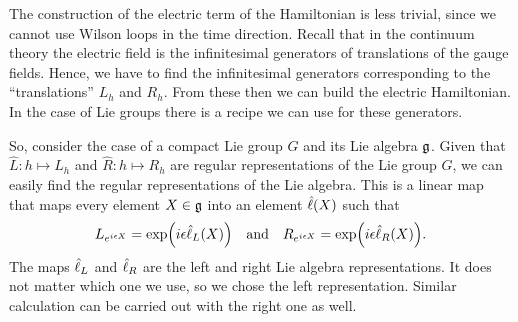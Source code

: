 The construction of the electric term of the Hamiltonian is less trivial, since we cannot use Wilson loops in the time direction.
Recall that in the continuum theory the electric field is the infinitesimal generators of translations of the gauge fields.
Hence, we have to find the infinitesimal generators corresponding to the ``translations'' $L_h$ and $R_h$.
From these then we can build the electric Hamiltonian.
In the case of Lie groups there is a recipe we can use for these generators.

So, consider the case of a compact Lie group $G$ and its Lie algebra $\mathfrak{g}$.
Given that $\hat{L}: h \mapsto L_h$ and $\hat{R}: h \mapsto R_h$ are regular representations of the Lie group $G$, we can easily find the regular representations of the Lie algebra.
This is a linear map that maps every element $X \in \mathfrak{g}$ into an element $\hat{\ell}(X)$ such that
\begin{equation}
    L_{e^{i \epsilon X}} = \exp \qty(i \epsilon \generator_L(X))
    \qand
    R_{e^{i \epsilon X}} = \exp \qty(i \epsilon \generator_R(X)).
\end{equation}
The maps $\hat{\ell}_L$ and $\hat{\ell}_R$ are the left and right Lie algebra representations.
It does not matter which one we use, so we chose the left representation.
Similar calculation can be carried out with the right one as well.

